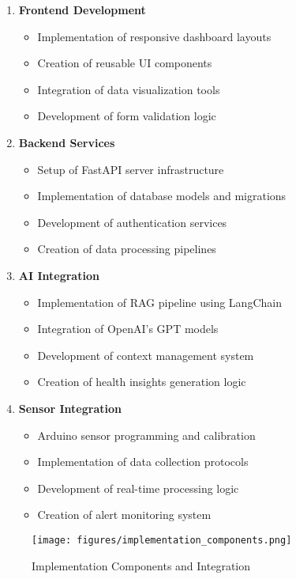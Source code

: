 \begin{enumerate}
    \item \textbf{Frontend Development}
    \begin{itemize}
        \item Implementation of responsive dashboard layouts
        \item Creation of reusable UI components
        \item Integration of data visualization tools
        \item Development of form validation logic
    \end{itemize}

    \item \textbf{Backend Services}
    \begin{itemize}
        \item Setup of FastAPI server infrastructure
        \item Implementation of database models and migrations
        \item Development of authentication services
        \item Creation of data processing pipelines
    \end{itemize}

    \item \textbf{AI Integration}
    \begin{itemize}
        \item Implementation of RAG pipeline using LangChain
        \item Integration of OpenAI's GPT models
        \item Development of context management system
        \item Creation of health insights generation logic
    \end{itemize}

    \item \textbf{Sensor Integration}
    \begin{itemize}
        \item Arduino sensor programming and calibration
        \item Implementation of data collection protocols
        \item Development of real-time processing logic
        \item Creation of alert monitoring system
    \end{itemize}
\end{enumerate}

\begin{figure}[H]
    \centering
    \texttt{[image: figures/implementation\_components.png]}
    \caption{Implementation Components and Integration}
\end{figure}

